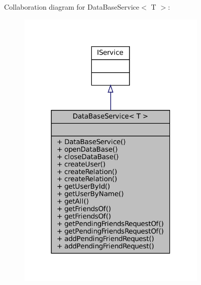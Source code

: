 Collaboration diagram for Data\+Base\+Service$<$ T $>$\+:
\nopagebreak
\begin{figure}[H]
\begin{center}
\leavevmode
\includegraphics[width=255pt]{classDataBaseService__coll__graph}
\end{center}
\end{figure}
